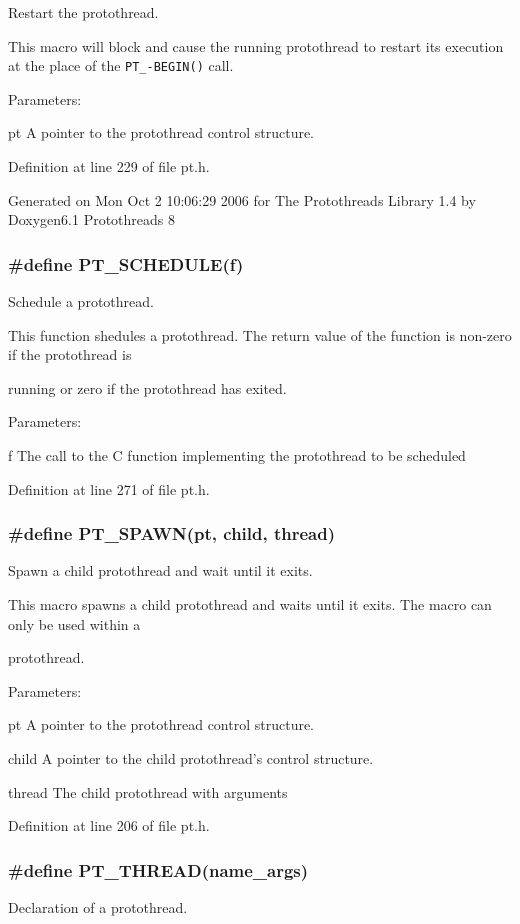 \documentclass[12pt]{article}
\begin{document}
\begin{CJK}{UTF8}{bsmi}
Restart the protothread.

This macro will block and cause the running protothread to restart its execution at the place of the \verb+PT_-BEGIN()+ call.

Parameters:

pt A pointer to the protothread control structure.

Definition at line 229 of file pt.h.

Generated on Mon Oct 2 10:06:29 2006 for The Protothreads Library 1.4 by Doxygen6.1 Protothreads 8

\subsubsection{\#define PT\_SCHEDULE(f)}

Schedule a protothread.

This function shedules a protothread. The return value of the function is non-zero if the protothread is

running or zero if the protothread has exited.

Parameters:

f The call to the C function implementing the protothread to be scheduled

Definition at line 271 of file pt.h.

\subsubsection{\#define PT\_SPAWN(pt, child, thread)}

Spawn a child protothread and wait until it exits.

This macro spawns a child protothread and waits until it exits. The macro can only be used within a

protothread.

Parameters:

pt A pointer to the protothread control structure.

child A pointer to the child protothread’s control structure.

thread The child protothread with arguments

Definition at line 206 of file pt.h.

\subsubsection{\#define PT\_THREAD(name\_args)}

Declaration of a protothread.


\end{CJK}
\end{document}
